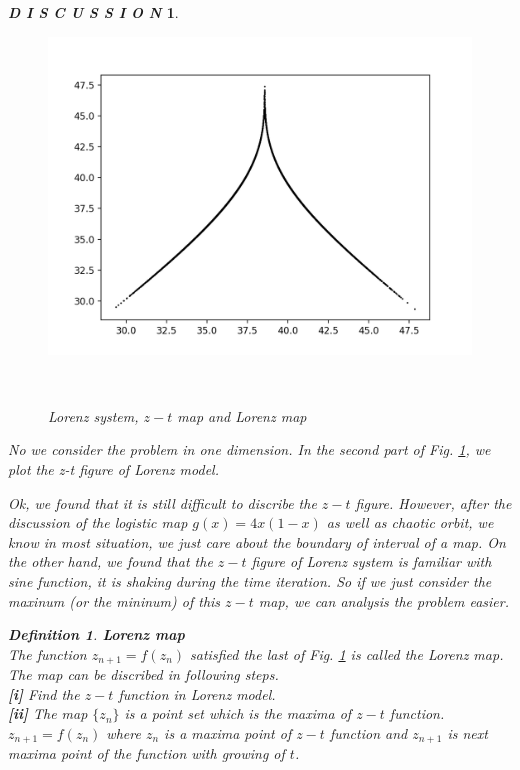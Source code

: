 \documentclass[12pt]{article}
\theoremstyle{plain}
\newtheorem{definition}{\textbf{Definition}}[section]
\newtheorem{discussion}{\textit{D I S C U S S I O N}}[section]
\begin{document}
\begin{discussion}
\begin{figure}[H]
\begin{minipage}[c][0.29\width]{0.29\textwidth}
   \includegraphics[width=\textwidth]{figure/section2/Lorenz-map.png}
\end{minipage}
\\[3ex]\caption{Lorenz system, $z-t$ map and Lorenz map}\label{Lorenz-map}
\end{figure}


No we consider the problem in one dimension. In the second part of Fig. \ref{Lorenz-map}, we plot the z-t figure of Lorenz model. 

Ok, we found that it is still difficult to discribe the $z-t$ figure. However, after the discussion of the logistic map $g(x) = 4x(1-x)$ as well as chaotic orbit, we know in most situation, we just care about the boundary of interval of a map. On the other hand, we found that the $z-t$ figure of Lorenz system is familiar with sine function, it is shaking during the time iteration. So if we just consider the maxinum (or the mininum) of this $z-t$ map, we can analysis the problem easier.




\begin{definition}\textbf{Lorenz map}
\\\noindent The function $z_{n+1} = f(z_n)$ satisfied the last of Fig. \ref{Lorenz-map} is called the Lorenz map. The map can be discribed in following steps.
\\\noindent \textbf{[i]} Find the $z-t$ function in Lorenz model.
\\\noindent \textbf{[ii]} The map $\{z_n\}$ is a point set which is the maxima of $z-t$ function. $z_{n+1} = f(z_n)$ where $z_{n}$ is a maxima point of $z-t$ function and $z_{n+1}$ is next maxima point of the function with growing of $t$.
\end{definition}





\end{discussion}
\end{document}
